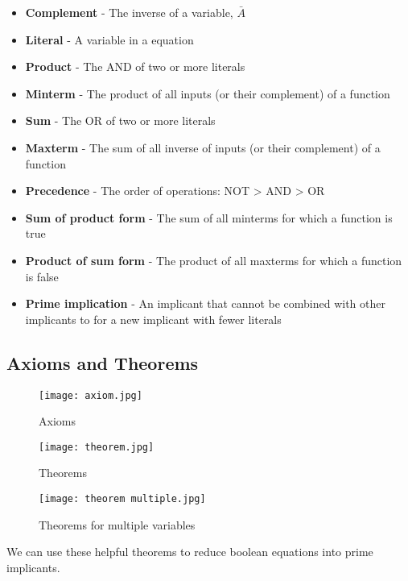 \begin{definition}
    \begin{itemize}
        \item \textbf{Complement} - The inverse of a variable, $\bar{A}$
        \item \textbf{Literal} - A variable in a equation
        \item \textbf{Product} - The AND of two or more literals
        \item \textbf{Minterm} - The product of all inputs (or their complement) of a function
        \item \textbf{Sum} - The OR of two or more literals
        \item \textbf{Maxterm} - The sum of all inverse of inputs (or their complement) of a function
        \item \textbf{Precedence} - The order of operations: NOT > AND > OR
        \item \textbf{Sum of product form} - The sum of all minterms for which a function is true
        \item \textbf{Product of sum form} - The product of all maxterms for which a function is false
        \item \textbf{Prime implication} - An implicant that cannot be combined with other implicants to for a new implicant with fewer literals
    \end{itemize}
\end{definition}

\subsection{Axioms and Theorems}

\begin{figure}[h]
    \centering
    \texttt{[image: axiom.jpg]}
    \caption{Axioms}
\end{figure}

\begin{figure}[h]
    \centering
    \texttt{[image: theorem.jpg]}
    \caption{Theorems}
\end{figure}

\begin{figure}[h]
    \centering
    \texttt{[image: theorem multiple.jpg]}
    \caption{Theorems for multiple variables}
\end{figure}

\pagebreak
We can use these helpful theorems to reduce boolean equations into prime implicants.

